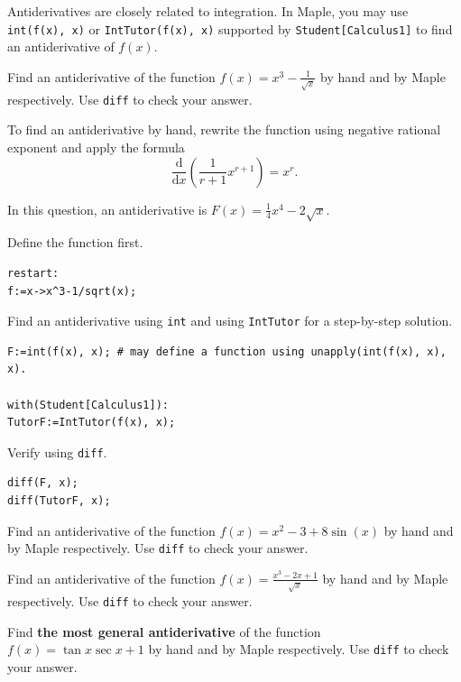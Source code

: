 \documentclass[en,11pt,simple]{elegantbook}
\let\BeginKnitrBlock\begin \let\EndKnitrBlock\end
\begin{document}
Antiderivatives are closely related to integration. In Maple, you may use \texttt{int(f(x),\ x)} or \texttt{IntTutor(f(x),\ x)} supported by \texttt{Student{[}Calculus1{]}} to find an antiderivative of \(f(x)\).

\BeginKnitrBlock{example}{}{}
\protect\hypertarget{exm:unnamed-chunk-126}{}{\label{exm:unnamed-chunk-126} }
Find an antiderivative of the function \(f(x)=x^3-\frac{1}{\sqrt{x}}\) by hand and by Maple respectively. Use \texttt{diff} to check your answer.
\EndKnitrBlock{example}

\BeginKnitrBlock{solution}{}{}
{}
To find an antiderivative by hand, rewrite the function using negative rational exponent and apply the formula
\[
\frac{\mathrm{d}}{\mathrm{d}x}\left(\frac{1}{r+1}x^{r+1}\right)=x^r.
\]

In this question, an antiderivative is \(F(x)=\frac14x^4-2\sqrt{x}\).

Define the function first.

\begin{verbatim}
restart:
f:=x->x^3-1/sqrt(x);
\end{verbatim}

Find an antiderivative using \texttt{int} and using \texttt{IntTutor} for a step-by-step solution.

\begin{verbatim}
F:=int(f(x), x); # may define a function using unapply(int(f(x), x), x).

with(Student[Calculus1]):
TutorF:=IntTutor(f(x), x);
\end{verbatim}

Verify using \texttt{diff}.

\begin{verbatim}
diff(F, x);
diff(TutorF, x);
\end{verbatim}
\EndKnitrBlock{solution}

\BeginKnitrBlock{exercise}{}{}
\protect\hypertarget{exr:unnamed-chunk-128}{}{\label{exr:unnamed-chunk-128} }
Find an antiderivative of the function \(f(x)=x^2-3+8\sin(x)\) by hand and by Maple respectively. Use \texttt{diff} to check your answer.
\EndKnitrBlock{exercise}

\BeginKnitrBlock{exercise}{}{}
\protect\hypertarget{exr:unnamed-chunk-129}{}{\label{exr:unnamed-chunk-129} }
Find an antiderivative of the function \(f(x)=\frac{x^3-2x+1}{\sqrt{x}}\) by hand and by Maple respectively. Use \texttt{diff} to check your answer.
\EndKnitrBlock{exercise}

\BeginKnitrBlock{exercise}{}{}
\protect\hypertarget{exr:unnamed-chunk-130}{}{\label{exr:unnamed-chunk-130} }
Find \textbf{the most general antiderivative} of the function \(f(x)=\tan x\sec x+1\) by hand and by Maple respectively. Use \texttt{diff} to check your answer.
\EndKnitrBlock{exercise}
\end{document}
